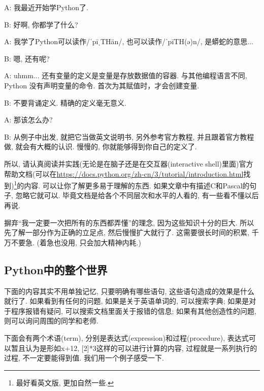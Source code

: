 \begin{dialogue}
	A: 我最近开始学Python了. 
	
	B: 好啊, 你都学了什么?
	
	A: 我学了Python可以读作/ˈpīˌTHän/, 也可以读作/ˈpīTH(ə)n/, 是蟒蛇的意思...
	
	B: 嗯, 还有呢? 
	
	A: uhmm... 还有变量的定义是变量是存放数据值的容器. 与其他编程语言不同, Python 没有声明变量的命令. 首次为其赋值时，才会创建变量. 
	
	B: 不要背诵定义. 精确的定义毫无意义. 
	
	A: 那该怎么办? 
	
	B: 从例子中出发, 就把它当做英文说明书, 另外参考官方教程, 并且跟着官方教程做, 就会有大概的认识. 慢慢的, 你就能够得到你自己的定义了. 
\end{dialogue}

所以, 请认真阅读并实践(无论是在脑子还是在交互器(interactive shell)里面)官方帮助文档(可以在\url{https://docs.python.org/zh-cn/3/tutorial/introduction.html}找到)\footnote{最好看英文版, 更加自然一些. }的内容.
可以让你了解更多易于理解的东西. 如果文章中有描述C和Pascal的句子, 忽略它就可以. 毕竟文档是给各个不同层次和水平的人看的, 有一些看不懂以后再说. 

\begin{idea}
摒弃``我一定要一次把所有的东西都弄懂''的理念, 因为这些知识十分的巨大. 所以先了解一部分作为正确的立足点, 然后慢慢扩大就行了. 这需要很长时间的积累, 千万不要急. (着急也没用, 只会加大精神内耗.)	
\end{idea}

\subsection{Python中的整个世界}

下面的内容其实不用单独记忆, 只要明确有哪些语句, 这些语句造成的效果是什么就行了. 如果看到有任何的问题, 如果是关于英语单词的, 可以搜索字典; 如果是对于程序报错有疑问, 可以搜索文档里面关于报错的信息; 如果有其他创造性的问题, 则可以询问周围的同学和老师. 

下面会有两个术语(term), 分别是表达式(expression)和过程(procedure), 表达式可以暂且认为是形如x+12,
{[}2{]}{*}3这样的可以进行计算的内容, 过程就是一系列执行的过程, 不一定要能得到值. 我们用一个例子感受一下.

\newpage

